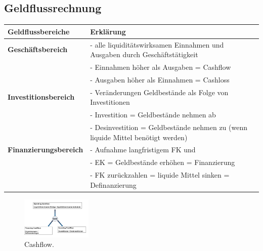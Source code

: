 \documentclass[../ZF_Wing.tex]{subfiles}
\begin{document}
\subsection{Geldflussrechnung}
\begin{table}[H]
\begin{tabular}{l|l}
\colorbox{orange!30} {\textbf{Geldflussbereiche}} & \colorbox{orange!30} {\textbf{Erklärung}}\\
\hline
\textbf{Geschäftsbereich} & - alle liquiditätswirksamen Einnahmen und Ausgaben durch Geschäftstätigkeit\\
& - Einnahmen höher als Ausgaben = Cashflow\\
& - Ausgaben höher als Einnahmen = Cashloss\\
\hline
\textbf{Investitionsbereich} & - Veränderungen Geldbestände als Folge von Investitionen\\
& - Investition = Geldbestände nehmen ab\\
& - Desinvestition = Geldbestände nehmen zu (wenn liquide Mittel benötigt werden)\\
\hline
\textbf{Finanzierungsbereich} & - Aufnahme langfristigem FK und \\
& - EK = Geldbestände erhöhen = Finanzierung \\
& - FK zurückzahlen = liquide Mittel sinken = Definanzierung \\
\end{tabular}
\end{table}

\begin{figure}[H]
\centering
\includegraphics[width=0.3\textwidth]{Resources/Image/Cashflow.png}
\caption{\label{fig:Cashflow}Cashflow.}
\end{figure}
\end{document}
